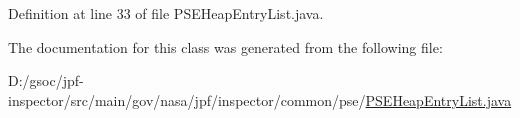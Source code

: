 Definition at line 33 of file P\+S\+E\+Heap\+Entry\+List.\+java.



The documentation for this class was generated from the following file\+:\begin{DoxyCompactItemize}
\item 
D\+:/gsoc/jpf-\/inspector/src/main/gov/nasa/jpf/inspector/common/pse/\hyperlink{_p_s_e_heap_entry_list_8java}{P\+S\+E\+Heap\+Entry\+List.\+java}\end{DoxyCompactItemize}
